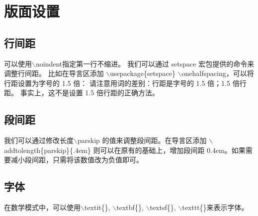 \section{版面设置}
\subsection{行间距}
\noindent 可以使用$\backslash$noindent指定第一行不缩进。
我们可以通过 setspace 宏包提供的命令来调整行间距。
比如在导言区添加
$\backslash$usepackage\{setspace\}
$\backslash$onehalfspacing，可以将行距设置为字号的 1.5 倍：
请注意用词的差别：行距是字号的 1.5 倍；1.5 倍行距。
事实上，这不是设置 1.5 倍行距的正确方法。
\subsection{段间距}
我们可以通过修改长度$\backslash$parskip 的值来调整段间距。在导言区添加
$\backslash$addtolength\{parskip\}\-\{.4em\}
则可以在原有的基础上，增加段间距 0.4em。如果需要减小段间距，只需将该数值改为负值即可。
\subsection{字体}
在数学模式中，可以使用$\backslash$textit\{\}, $\backslash$textbf\{\}, 
$\backslash$textsf\{\}, $\backslash$texttt\{\}来表示字体。